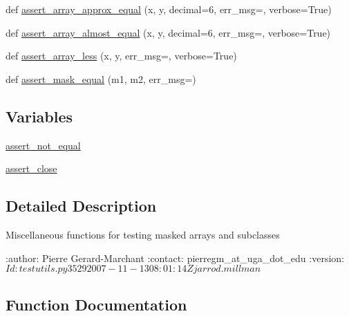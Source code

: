 \begin{DoxyCompactItemize}
\item 
def \hyperlink{namespacenumpy_1_1ma_1_1testutils_a4a03954c84c9d6dba64bcd2529c4a98d}{assert\+\_\+array\+\_\+approx\+\_\+equal} (x, y, decimal=6, err\+\_\+msg=\textquotesingle{}\textquotesingle{}, verbose=True)
\item 
def \hyperlink{namespacenumpy_1_1ma_1_1testutils_af045714a2168bc5b4c62169632355210}{assert\+\_\+array\+\_\+almost\+\_\+equal} (x, y, decimal=6, err\+\_\+msg=\textquotesingle{}\textquotesingle{}, verbose=True)
\item 
def \hyperlink{namespacenumpy_1_1ma_1_1testutils_a589669f9fd4d77f178c9d40186ba6858}{assert\+\_\+array\+\_\+less} (x, y, err\+\_\+msg=\textquotesingle{}\textquotesingle{}, verbose=True)
\item 
def \hyperlink{namespacenumpy_1_1ma_1_1testutils_ad7bec1fa9a0cef1745c6bacf233c5b46}{assert\+\_\+mask\+\_\+equal} (m1, m2, err\+\_\+msg=\textquotesingle{}\textquotesingle{})
\end{DoxyCompactItemize}
\subsection*{Variables}
\begin{DoxyCompactItemize}
\item 
\hyperlink{namespacenumpy_1_1ma_1_1testutils_ada3f29727691024d2df793ecd026cf75}{assert\+\_\+not\+\_\+equal}
\item 
\hyperlink{namespacenumpy_1_1ma_1_1testutils_a2e57c74f10427169556edf257048dcda}{assert\+\_\+close}
\end{DoxyCompactItemize}


\subsection{Detailed Description}
\begin{DoxyVerb}Miscellaneous functions for testing masked arrays and subclasses

:author: Pierre Gerard-Marchant
:contact: pierregm_at_uga_dot_edu
:version: $Id: testutils.py 3529 2007-11-13 08:01:14Z jarrod.millman $\end{DoxyVerb}
 

\subsection{Function Documentation}
\mbox{\label{namespacenumpy_1_1ma_1_1testutils_a65073eb9423d35e7ff9024d5864a0181}} 
